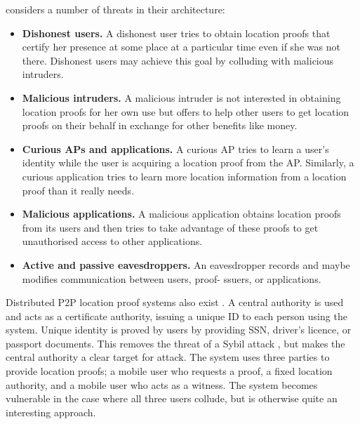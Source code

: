 \documentclass[12pt]{article}
\begin{document}
\cite{luo} considers a number of threats in their architecture:
\begin{itemize}
	\item \textbf{Dishonest users.} A dishonest user tries to obtain location proofs that certify her presence at some place at a particular time even if she was not there. Dishonest users may achieve this goal by colluding with malicious intruders.
	\item \textbf{Malicious intruders.} A malicious intruder is not interested in obtaining location proofs for her own use but offers to help other users to get location proofs on their behalf in exchange for other benefits like money.
	\item \textbf{Curious APs and applications.} A curious AP tries to learn a user’s identity while the user is acquiring a location proof from the AP. Similarly, a curious application tries to learn more location information from a location proof than it really needs.
	\item \textbf{Malicious applications.} A malicious application obtains location proofs from its users and then tries to take advantage of these proofs to get unauthorised access to other applications.
	\item \textbf{Active and passive eavesdroppers.} An eavesdropper records and maybe modifies communication between users, proof- ssuers, or applications.
\end{itemize}

Distributed P2P location proof systems also exist \cite{khan}. A central authority is used and acts as a certificate authority, issuing a unique ID to each person using the system. Unique identity is proved by users by providing SSN, driver’s licence, or passport documents. This removes the threat of a Sybil attack \cite{sybil}, but makes the central authority a clear target for attack. The system uses three parties to provide location proofs; a mobile user who requests a proof, a fixed location authority, and a mobile user who acts as a witness. The system becomes vulnerable in the case where all three users collude, but is otherwise quite an interesting approach.
\end{document}
